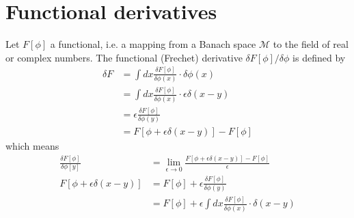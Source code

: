 \documentclass[10pt,a4paper]{book}
\theoremstyle{definition}
\begin{document}
\section{Functional derivatives}
Let $F[\phi]$ a functional, i.e. a mapping from a Banach space $\mathcal{M}$ to the field of real or complex numbers. The functional (Frechet) derivative $\delta F[\phi]/\delta\phi$ is defined by
\begin{align}
    \delta F
    &=\int dx \frac{\delta F[\phi]}{\delta\phi(x)}\cdot\delta\phi(x)\\
    &=\int dx \frac{\delta F[\phi]}{\delta\phi(x)}\cdot\epsilon\delta(x-y)\\
    &=\epsilon\frac{\delta F[\phi]}{\delta\phi(y)}\\
    &=F[\phi+\epsilon\delta(x-y)]-F[\phi]
\end{align}
which means
\begin{align}
    \frac{\delta F[\phi]}{\delta\phi[y]}&=\lim_{\epsilon\rightarrow0}\frac{F[\phi+\epsilon\delta(x-y)]-F[\phi]}{\epsilon}\\
    F[\phi+\epsilon\delta(x-y)]&=F[\phi]+\epsilon\frac{\delta F[\phi]}{\delta\phi(y)}\\
    &=F[\phi]+\epsilon\int dx \frac{\delta F[\phi]}{\delta\phi(x)}\cdot\delta(x-y)
\end{align}
\end{document}

